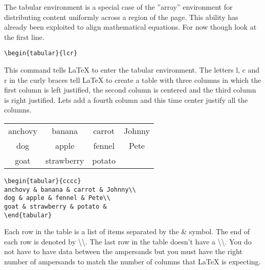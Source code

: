 \vspace*{2ex}

The tabular environment is a special case of the ''array'' environment for distributing content uniformly across a region of the page.  This ability has already been exploited to align mathematical equations. For now though look at the first line.

\vspace*{2ex}

\begin{verbatim}
\begin{tabular}{lcr}
\end{verbatim}

\vspace*{2ex}

This command tells LaTeX to enter the tabular environment. The letters l, c and r in the curly braces tell LaTeX to create a table with three columns in which the first column is left justified, the second column is centered and the third column is right justified. Lets add a fourth column and this time center justify all the columns.

\begin{center}
\begin{tabular}{cccc}
anchovy & banana & carrot & Johnny\\
dog & apple & fennel & Pete\\
goat & strawberry & potato &
\end{tabular}

\vspace*{2ex}

\begin{verbatim}
\begin{tabular}{cccc}
anchovy & banana & carrot & Johnny\\
dog & apple & fennel & Pete\\
goat & strawberry & potato &
\end{tabular}
\end{verbatim}
\end{center}

\vspace*{2ex}

Each row in the table is a list of items separated by the {\&} symbol. The end of each row is denoted by \textbackslash\textbackslash.  The last row in the table doesn't have a \textbackslash\textbackslash. You do not have to have data between the ampersands but you must have the right number of ampersands to match the number of columns that LaTeX is expecting.

